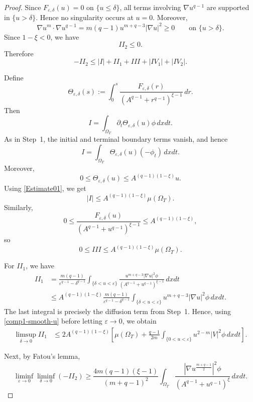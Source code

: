 \documentclass{amsart}
\numberwithin{equation}{section}
\begin{document}
\begin{proof}
Since $F_{\varepsilon,\delta}(u)=0$ on $\{u\le\delta\}$, all terms
involving $\nabla u^{q-1}$ are supported in $\{u>\delta\}$. Hence no
singularity occurs at $u=0$. Moreover,
\[
\nabla u^m\cdot\nabla u^{q-1}
=
m(q-1)u^{m+q-3}|\nabla u|^2
\ge0
\qquad\text{on }\{u>\delta\}.
\]
Since $1-\xi<0$, we have
\[
II_2\le0.
\]
Therefore
\begin{equation}\label{basic-smooth-u}
-II_2
\le
|I|+II_1+III+|IV_1|+|IV_2|.
\end{equation}

Define
\[
\Theta_{\varepsilon,\delta}(s)
:=
\int_0^s
\frac{F_{\varepsilon,\delta}(r)}
{\left(A^{q-1}+r^{q-1}\right)^{\xi-1}}
\,dr.
\]
Then
\[
I
=
\int_{\Omega_T}
\partial_t\Theta_{\varepsilon,\delta}(u)\phi\,dxdt.
\]
As in Step~1, the initial and terminal boundary terms vanish, and hence
\[
I
=
\int_{\Omega_T}
\Theta_{\varepsilon,\delta}(u)(-\phi_t)\,dxdt.
\]
Moreover,
\[
0\le
\Theta_{\varepsilon,\delta}(u)
\le
A^{(q-1)(1-\xi)}u.
\]
Using \eqref{Estimate01}, we get
\begin{equation}\label{I2-smooth-u}
|I|
\le
A^{(q-1)(1-\xi)}\mu(\Omega_T).
\end{equation}
Similarly,
\[
0\le
\frac{F_{\varepsilon,\delta}(u)}
{\left(A^{q-1}+u^{q-1}\right)^{\xi-1}}
\le
A^{(q-1)(1-\xi)},
\]
so
\begin{equation}\label{III2-smooth-u}
0\le III
\le
A^{(q-1)(1-\xi)}\mu(\Omega_T).
\end{equation}

For $II_1$, we have
\[
\begin{aligned}
II_1
&=
\frac{m(q-1)}
{\varepsilon^{q-1}-\delta^{q-1}}
\int_{\{\delta<u<\varepsilon\}}
\frac{
u^{m+q-3}|\nabla u|^2\phi
}
{\left(A^{q-1}+u^{q-1}\right)^{\xi-1}}
\,dxdt \\
&\le
A^{(q-1)(1-\xi)}
\frac{m(q-1)}
{\varepsilon^{q-1}-\delta^{q-1}}
\int_{\{\delta<u<\varepsilon\}}
u^{m+q-3}|\nabla u|^2\phi
\,dxdt.
\end{aligned}
\]
The last integral is precisely the diffusion term from Step~1. Hence, using
\eqref{comp1-smooth-u} before letting $\varepsilon\to0$, we obtain
\begin{equation}\label{II1-smooth-u}
\begin{aligned}
\limsup_{\delta\to0}II_1
&\le
2A^{(q-1)(1-\xi)}
\left[
\mu(\Omega_T)
+
\frac{q-1}{2m}
\int_{\{0<u<\varepsilon\}}
u^{2-m}|V|^2\phi\,dxdt
\right].
\end{aligned}
\end{equation}

Next, by Fatou's lemma,
\begin{equation}\label{II2-smooth-u}
\liminf_{\varepsilon\to0}
\liminf_{\delta\to0}
(-II_2) \ge
\frac{4m(q-1)(\xi-1)}
{(m+q-1)^2}
\int_{\Omega_T}
\frac{
\left|\nabla u^{\frac{m+q-1}{2}}\right|^2\phi
}
{\left(A^{q-1}+u^{q-1}\right)^\xi}
\,dxdt.
\end{equation}


\end{proof}
\end{document}
